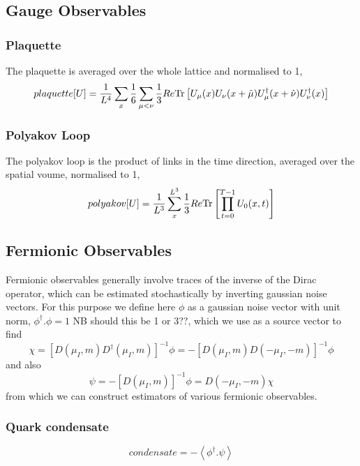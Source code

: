 \documentclass[a4paper,12pt]{article}
\newcommand{\Tr}{{\rm Tr}}
\begin{document}
\subsection{Gauge Observables}
\subsubsection{Plaquette}
The plaquette is averaged over the whole lattice and normalised to 1,
\begin{equation}
 plaquette[U] = \frac{1}{L^4} \sum_x \frac{1}{6}\sum_{\mu<\nu} \frac{1}{3} Re \Tr \left[ U_{\mu}(x)  U_{\nu}(x+\hat\mu)  U_{\mu}^{\dagger}(x+\hat\nu)  U_{\nu}^{\dagger}(x)\right]
\end{equation}

\subsubsection{Polyakov Loop}
The polyakov loop is the product of links in the time direction, averaged over the spatial voume, normalised to 1,
\begin{equation}
 polyakov[U] = \frac{1}{L^3} \sum_x^{L^3} \frac{1}{3} Re \Tr \left[\prod_{t=0}^{T-1} U_{0}(x, t)\right]
\end{equation}

\subsection{Fermionic Observables}
Fermionic observables generally involve traces of the inverse of the Dirac operator, which can be estimated stochastically by 
inverting gaussian noise vectors. For this purpose we define here $\phi$ as a gaussian noise vector with unit norm, $\phi^{\dagger}.\phi=1$ NB should this be 1 or 3??,
which we use as a source vector to find
\begin{equation}
 \chi = \left[D(\mu_I,m) D^{\dagger}(\mu_I,m)\right]^{-1} \phi = -\left[D(\mu_I,m) D(-\mu_I,-m)\right]^{-1} \phi
\end{equation}
and also
\begin{equation}
 \psi = -\left[D(\mu_I,m)\right]^{-1} \phi = D(-\mu_I,-m) \chi
\end{equation}
from which we can construct estimators of various fermionic observables.

\subsubsection{Quark condensate}
\begin{equation}
 condensate = -\left\langle \phi^{\dagger}.\psi \right\rangle
\end{equation}
\end{document}
